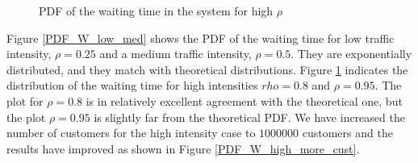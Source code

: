 \documentclass[12pt, a4paper]{article}
\begin{document}
\begin{figure}[H]
  \centering
  \hspace{0px}
  \caption{PDF of the waiting time in the system for high $\rho$}  
  \label{PDF_W_high}
\end{figure}

Figure \ref{PDF_W_low_med} shows the PDF of the waiting time for low traffic intensity, $\rho=0.25$
and a medium traffic intensity, $\rho=0.5$. They are exponentially distributed, and they match with
theoretical distributions. Figure \ref{PDF_W_high} indicates the distribution of the waiting time
for high intensities $rho =0.8$ and $\rho=0.95$. The plot for $\rho=0.8$ is in relatively excellent 
agreement with the theoretical one, but the plot $\rho =0.95$ is slightly far from the theoretical 
PDF. We have increased the number of customers for the high intensity case to $1000000$ customers
and the results have improved as shown in Figure \ref{PDF_W_high_more_cust}.
\end{document}
